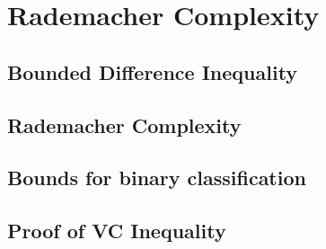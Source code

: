 \newpage\section{Rademacher Complexity}
\subsection{Bounded Difference Inequality}



\subsection{Rademacher Complexity}




\subsection{Bounds for binary classification}




\subsection{Proof of VC Inequality}
\label{sec:proof_of_vc_inequality}
